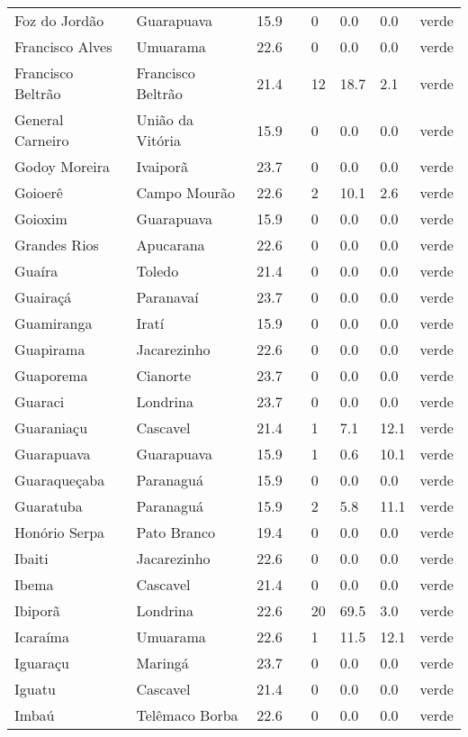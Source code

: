 \begin{longtable}{l|lllllll}
  Foz do Jordão & Guarapuava & 15.9 &  & 0 & 0.0 & 0.0 & verde \\ 
  Francisco Alves & Umuarama & 22.6 &  & 0 & 0.0 & 0.0 & verde \\ 
  Francisco Beltrão & Francisco Beltrão & 21.4 &  & 12 & 18.7 & 2.1 & verde \\ 
  General Carneiro & União da Vitória & 15.9 &  & 0 & 0.0 & 0.0 & verde \\ 
  Godoy Moreira & Ivaiporã & 23.7 &  & 0 & 0.0 & 0.0 & verde \\ 
  Goioerê & Campo Mourão & 22.6 &  & 2 & 10.1 & 2.6 & verde \\ 
  Goioxim & Guarapuava & 15.9 &  & 0 & 0.0 & 0.0 & verde \\ 
  Grandes Rios & Apucarana & 22.6 &  & 0 & 0.0 & 0.0 & verde \\ 
  Guaíra & Toledo & 21.4 &  & 0 & 0.0 & 0.0 & verde \\ 
  Guairaçá & Paranavaí & 23.7 &  & 0 & 0.0 & 0.0 & verde \\ 
  Guamiranga & Iratí & 15.9 &  & 0 & 0.0 & 0.0 & verde \\ 
  Guapirama & Jacarezinho & 22.6 &  & 0 & 0.0 & 0.0 & verde \\ 
  Guaporema & Cianorte & 23.7 &  & 0 & 0.0 & 0.0 & verde \\ 
  Guaraci & Londrina & 23.7 &  & 0 & 0.0 & 0.0 & verde \\ 
  Guaraniaçu & Cascavel & 21.4 &  & 1 & 7.1 & 12.1 & verde \\ 
  Guarapuava & Guarapuava & 15.9 &  & 1 & 0.6 & 10.1 & verde \\ 
  Guaraqueçaba & Paranaguá & 15.9 &  & 0 & 0.0 & 0.0 & verde \\ 
  Guaratuba & Paranaguá & 15.9 &  & 2 & 5.8 & 11.1 & verde \\ 
  Honório Serpa & Pato Branco & 19.4 &  & 0 & 0.0 & 0.0 & verde \\ 
  Ibaiti & Jacarezinho & 22.6 &  & 0 & 0.0 & 0.0 & verde \\ 
  Ibema & Cascavel & 21.4 &  & 0 & 0.0 & 0.0 & verde \\ 
  Ibiporã & Londrina & 22.6 &  & 20 & 69.5 & 3.0 & verde \\ 
  Icaraíma & Umuarama & 22.6 &  & 1 & 11.5 & 12.1 & verde \\ 
  Iguaraçu & Maringá & 23.7 &  & 0 & 0.0 & 0.0 & verde \\ 
  Iguatu & Cascavel & 21.4 &  & 0 & 0.0 & 0.0 & verde \\ 
  Imbaú & Telêmaco Borba & 22.6 &  & 0 & 0.0 & 0.0 & verde \\ 

\end{longtable}
